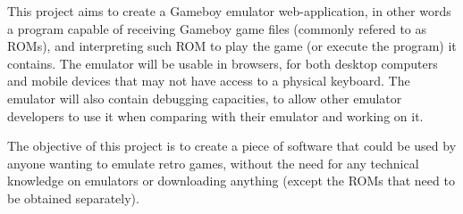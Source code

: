 This project aims to create a Gameboy emulator web-application, in other words a program capable of receiving Gameboy game files (commonly refered to as ROMs), and interpreting such ROM to play the game (or execute the program) it contains. The emulator will be usable in browsers, for both desktop computers and mobile devices that may not have access to a physical keyboard. The emulator will also contain debugging capacities, to allow other emulator developers to use it when comparing with their emulator and working on it.

The objective of this project is to create a piece of software that could be used by anyone wanting to emulate retro games, without the need for any technical knowledge on emulators or downloading anything (except the ROMs that need to be obtained separately).
